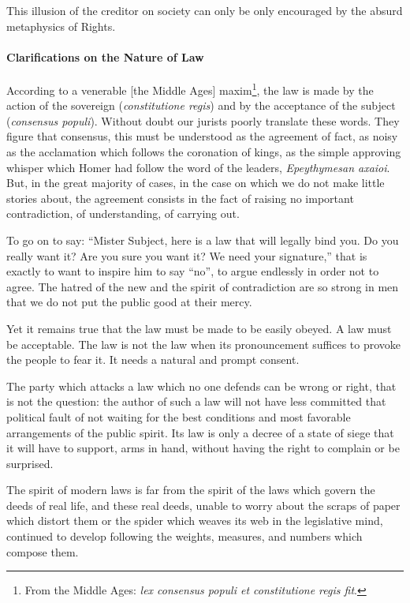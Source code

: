 This illusion of the creditor on society can only be only encouraged by the absurd metaphysics of Rights.

\paragraph{Clarifications on the Nature of Law} According to a venerable [the Middle Ages] maxim\footnote{From the Middle Ages: \textit{lex consensus populi et constitutione regis fit}.}, the law is made by the action of the sovereign (\textit{constitutione regis}) and by the acceptance of the subject (\textit{consensus populi}). Without doubt our jurists poorly translate these words. They figure that consensus, this must be understood as the agreement of fact, as noisy as the acclamation which follows the coronation of kings, as the simple approving whisper which Homer had follow the word of the leaders, \textit{Epeythymesan axaioi}. But, in the great majority of cases, in the case on which we do not make little stories about, the agreement consists in the fact of raising no important contradiction, of understanding, of carrying out.

To go on to say: “Mister Subject, here is a law that will legally bind you. Do you really want it? Are you sure you want it? We need your signature,” that is exactly to want to inspire him to say “no”, to argue endlessly in order not to agree. The hatred of the new and the spirit of contradiction are so strong in men that we do not put the public good at their mercy.

Yet it remains true that the law must be made to be easily obeyed. A law must be acceptable. The law is not the law when its pronouncement suffices to provoke the people to fear it. It needs a natural and prompt consent.

The party which attacks a law which no one defends can be wrong or right, that is not the question: the author of such a law will not have less committed that political fault of not waiting for the best conditions and most favorable arrangements of the public spirit. Its law is only a decree of a state of siege that it will have to support, arms in hand, without having the right to complain or be surprised.

The spirit of modern laws is far from the spirit of the laws which govern the deeds of real life, and these real deeds, unable to worry about the scraps of paper which distort them or the spider which weaves its web in the legislative mind, continued to develop following the weights, measures, and numbers which compose them.

